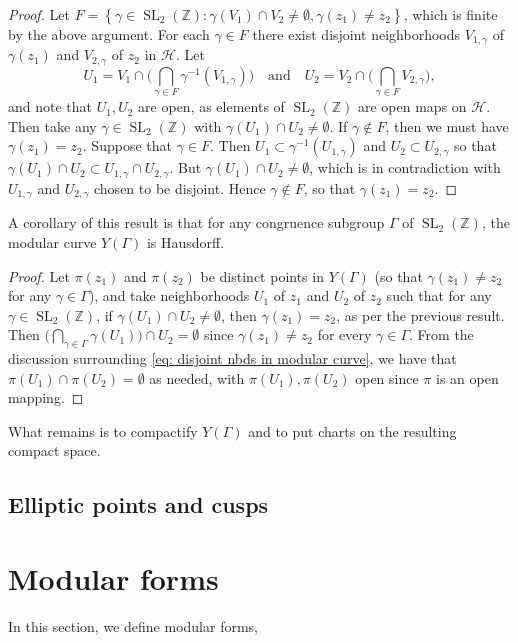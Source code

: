 \documentclass[10pt,leqno]{article}
\newcommand{\cbr}[1]{\left\{#1\right\}}
\DeclareMathOperator{\SL}{SL}
\begin{document}
\begin{proof}
    Let $F = \cbr{\gamma\in \SL_2(\mathbb{Z}): \gamma(V_1)\cap V_2\neq \emptyset, \gamma(z_1)\neq z_2}$, which is finite by the above argument. For each $\gamma \in F$ there exist disjoint neighborhoods $V_{1,\gamma}$ of $\gamma(z_1)$ and $V_{2,\gamma}$ of $z_2$ in $\mathcal H$. Let \[U_1 = V_1\cap \Bigg(\bigcap_{\gamma\in F}\gamma^{-1}(V_{1,\gamma})\Bigg)\quad\text{and}\quad U_2 = V_2\cap \Bigg(\bigcap_{\gamma\in F}V_{2,\gamma}\Bigg),\] and note that $U_1,U_2$ are open, as elements of $\SL_2(\mathbb{Z})$ are open maps on $\mathcal H$. Then take any $\gamma\in \SL_2(\mathbb{Z})$ with $\gamma(U_1)\cap U_2\neq \emptyset$. If $\gamma\not\in F$, then we must have $\gamma(z_1) = z_2$. Suppose that $\gamma\in F$. Then $U_1\subset \gamma^{-1}(U_{1,\gamma})$ and $U_2\subset U_{2,\gamma}$ so that $ \gamma(U_1)\cap U_2\subset U_{1,\gamma}\cap U_{2,\gamma}$. But $\gamma(U_1)\cap U_2\neq \emptyset$, which is in contradiction with $U_{1,\gamma}$ and $U_{2,\gamma}$ chosen to be disjoint. Hence $\gamma\not\in F$, so that $\gamma(z_1)= z_2$.
\end{proof}

A corollary of this result is that for any congruence subgroup $\varGamma$ of $\SL_2(\mathbb{Z})$, the modular curve $Y(\varGamma)$ is Hausdorff. 
\begin{proof}
    Let $\pi(z_1)$ and $\pi(z_2)$ be distinct points in $Y(\varGamma)$ (so that $\gamma(z_1)\neq z_2$ for any $\gamma\in \varGamma$), and take neighborhoods $U_1$ of $z_1$ and $U_2$ of $z_2$ such that for any $\gamma\in \SL_2(\mathbb{Z})$, if $\gamma(U_1)\cap U_2\neq \emptyset$, then $\gamma(z_1) = z_2$, as per the previous result. Then $\big(\bigcap_{\gamma\in\varGamma}\gamma(U_1)\big)\cap U_2 = \emptyset$ since $\gamma(z_1)\neq z_2$ for every $\gamma\in \varGamma$. From the discussion surrounding \cref{eq: disjoint nbds in modular curve}, we have that $\pi(U_1)\cap\pi(U_2) = \emptyset$ as needed, with $\pi(U_1),\pi(U_2)$ open since $\pi$ is an open mapping.
\end{proof} 

What remains is to compactify $Y(\varGamma)$ and to put charts on the resulting compact space.


\subsection{Elliptic points and cusps}

\newpage\section{Modular forms}
In this section, we define modular forms, 
\end{document}

